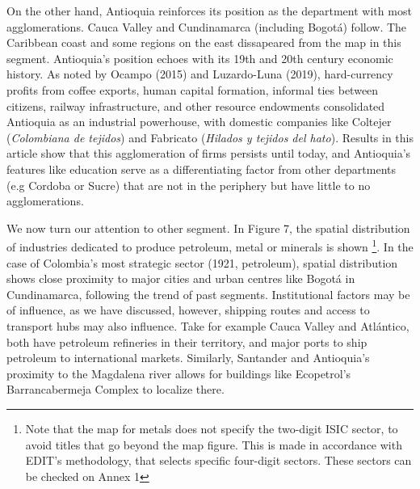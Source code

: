 \documentclass[12pt,a4paper]{article}
\begin{document}
On the other hand, Antioquia reinforces its position as the department with most agglomerations. Cauca Valley and Cundinamarca (including Bogotá) follow. The Caribbean coast and some regions on the east dissapeared from the map in this segment. Antioquia's position echoes with its 19th and 20th century economic history. As noted by Ocampo (2015) and Luzardo-Luna (2019), hard-currency profits from coffee exports, human capital formation, informal ties between citizens, railway infrastructure, and other resource endowments consolidated Antioquia as an industrial powerhouse, with domestic companies like Coltejer (\textit{Colombiana de tejidos}) and Fabricato (\textit{Hilados y tejidos del hato}). Results in this article show that this agglomeration of firms persists until today, and Antioquia's features like education serve as a differentiating factor from other departments (e.g Cordoba or Sucre) that are not in the periphery but have little to no agglomerations. \newpage

We now turn our attention to other segment. In Figure 7, the spatial distribution of industries dedicated to produce petroleum, metal or minerals is shown \footnote{Note that the map for metals does not specify the two-digit ISIC sector, to avoid titles that go beyond the map figure. This is made in accordance with EDIT's methodology, that selects specific four-digit sectors. These sectors can be checked on Annex 1}. In the case of Colombia's most strategic sector (1921, petroleum), spatial distribution shows close proximity to major cities and urban centres like Bogotá in Cundinamarca, following the trend of past segments. Institutional factors may be of influence, as we have discussed, however, shipping routes and access to transport hubs may also influence. Take for example Cauca Valley and Atlántico, both have petroleum refineries in their territory, and major ports to ship petroleum to international markets. Similarly, Santander and Antioquia's proximity to the Magdalena river allows for buildings like Ecopetrol's Barrancabermeja Complex to localize there.
\end{document}
